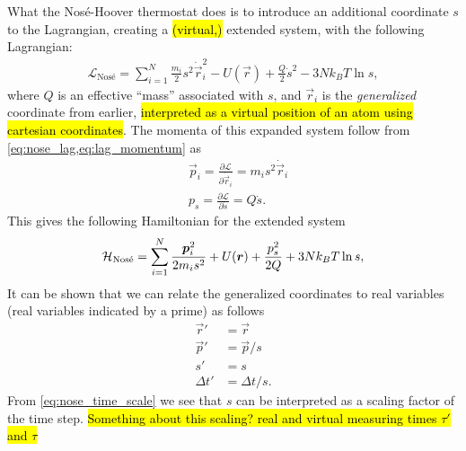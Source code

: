 What the Nosé-Hoover thermostat does is to introduce an additional coordinate $s$ to the Lagrangian, creating a \hl{(virtual,)} extended system, with the following Lagrangian:
\begin{align}
    \mathcal{L}_\text{Nos\'e} = \sum_{i=1}^N \frac{m_i}{2}s^2 \dot{\vec r}_i^2 - U(\vec r) + \frac{Q}{2}\dot s^2 - 3Nk_BT \ln s,
    \label{eq:nose_lag}
\end{align}
where $Q$ is an effective ``mass'' associated with $s$, and $\vec r_i$ is the \emph{generalized} coordinate from earlier, \hl{interpreted as a virtual position of an atom using cartesian coordinates}. The momenta of this expanded system follow from \cref{eq:nose_lag,eq:lag_momentum} as
\begin{align*}
    &\vec p_i = \frac{\partial \mathcal{L}}{\partial \dot{\vec r}_i} = m_i s^2 \dot{\vec r}_i \\
    &p_s = \frac{\partial \mathcal{L}}{\partial \dot s} = Q\dot s.
\end{align*}
This gives the following Hamiltonian for the extended system
\begin{align}
    \operatorname{\mathcal{H}}_\text{Nos\'e} = \sum_{i=1}^N \frac{\boldsymbol{p}_i^2}{2m_is^2} + U(\boldsymbol{r}) + \frac{p_s^2}{2Q} + 3Nk_BT \ln s,
    \label{eq:nose_hamiltonian}
\end{align}
It can be shown that we can relate the generalized coordinates to real variables (real variables indicated by a prime) as follows
\begin{align}
    \vec r' &= \vec r \nonumber\\
    \vec p' &= \vec p/s \nonumber\\
    s' &= s \nonumber\\
    \Delta t' &= \Delta t/s. \label{eq:nose_time_scale}
\end{align}
From \cref{eq:nose_time_scale} we see that $s$ can be interpreted as a scaling factor of the time step. \hl{Something about this scaling? real and virtual measuring times $\tau'$ and $\tau$}

